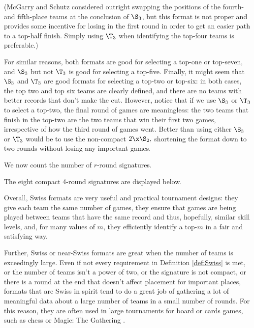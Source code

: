 {    (McGarry and Schutz \cite{four_five_swap} considered outright swapping the positions of the fourth- and fifth-place teams at the conclusion of $\S_3$, but this format is not proper and provides some incentive for losing in the first round in order to get an easier path to a top-half finish. Simply using $\T_3$ when identifying the top-four teams is preferable.)

    For similar reasons, both formats are good for selecting a top-one or top-seven, and $\S_3$ but not $\T_3$ is good for selecting a top-five. Finally, it might seem that $\S_3$ and $\T_3$ are good formats for selecting a top-two or top-six: in both cases, the top two and top six teams are clearly defined, and there are no teams with better records that don't make the cut. However, notice that if we use $\S_3$ or $\T_3$ to select a top-two, the final round of games are meaningless: the two teams that finish in the top-two are the two teams that win their first two games, irrespective of how the third round of games went. Better than using either $\S_3$ or $\T_3$ would be to use the non-compact $2\x\S_2,$ shortening the format down to two rounds without losing any important games.

    We now count the number of $r$-round signatures.


    The eight compact 4-round signatures are displayed below.

    
    Overall, Swiss formats are very useful and practical tournament designs: they give each team the same number of games, they ensure that games are being played between teams that have the same record and thus, hopefully, similar skill levels, and, for many values of $m$, they efficiently identify a top-$m$ in a fair and satisfying way.

    Further, Swiss or near-Swiss formats are great when the number of teams is exceedingly large. Even if not every requirement in Definition \ref{def:Swiss} is met, or the number of teams isn't a power of two, or the signature is not compact, or there is a round at the end that doesn't affect placement for important places, formats that are Swiss in spirit tend to do a great job of gathering a lot of meaningful data about a large number of teams in a small number of rounds. For this reason, they are often used in large tournaments for board or cards games, such as chess or Magic: The Gathering \cite{ifno_mtg}.
}